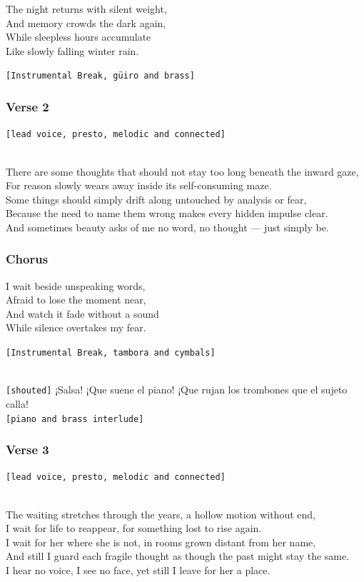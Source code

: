 \documentclass[]{article}
\begin{document}
The night returns with silent weight,\\
And memory crowds the dark again,\\
While sleepless hours accumulate\\
Like slowly falling winter rain.

\texttt{{[}Instrumental\ Break,\ güiro\ and\ brass{]}}

\subsubsection{Verse 2}\label{verse-2-19}

\texttt{{[}lead\ voice,\ presto,\ melodic\ and\ connected{]}}\strut \\
There are some thoughts that should not stay too long beneath the inward
gaze,\\
For reason slowly wears away inside its self-consuming maze.\\
Some things should simply drift along untouched by analysis or fear,\\
Because the need to name them wrong makes every hidden impulse clear.\\
And sometimes beauty asks of me no word, no thought --- just simply be.

\subsubsection{Chorus}\label{chorus-60}

I wait beside unspeaking words,\\
Afraid to lose the moment near,\\
And watch it fade without a sound\\
While silence overtakes my fear.

\texttt{{[}Instrumental\ Break,\ tambora\ and\ cymbals{]}}\strut \\
\texttt{{[}shouted{]}} ¡Salsa! ¡Que suene el piano! ¡Que rujan los
trombones que el sujeto calla!\\
\texttt{{[}piano\ and\ brass\ interlude{]}}

\subsubsection{Verse 3}\label{verse-3-9}

\texttt{{[}lead\ voice,\ presto,\ melodic\ and\ connected{]}}\strut \\
The waiting stretches through the years, a hollow motion without end,\\
I wait for life to reappear, for something lost to rise again.\\
I wait for her where she is not, in rooms grown distant from her name,\\
And still I guard each fragile thought as though the past might stay the
same.\\
I hear no voice, I see no face, yet still I leave for her a place.
\end{document}
